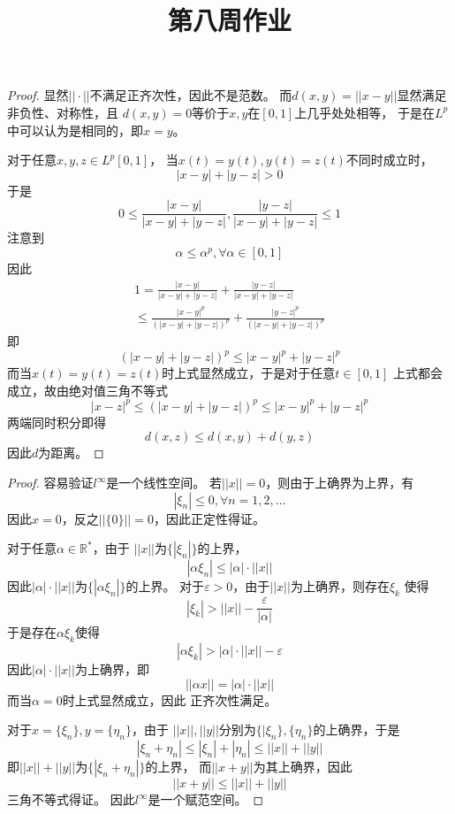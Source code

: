 \documentclass[cn]{homework}
\title{第八周作业}
\begin{document}
    \maketitle

    \problem

    \problem
    \begin{proof}
        显然$||\cdot||$不满足正齐次性，因此不是范数。
        而$d(x,y)=||x-y||$显然满足非负性、对称性，且
        $d(x,y)=0$等价于$x,y$在$[0,1]$上几乎处处相等，
        于是在$L^p$中可以认为是相同的，即$x=y$。

        对于任意$x,y,z\in L^p[0,1]$，
        当$x(t)=y(t),y(t)=z(t)$不同时成立时，
        \[|x-y|+|y-z|>0\]
        于是
        \[0\leq\frac{|x-y|}{|x-y|+|y-z|},\frac{|y-z|}{|x-y|+|y-z|}\leq 1\]
        注意到
        \[\alpha\leq\alpha^p,\forall\alpha\in[0,1]\]
        因此
        \begin{multline*}
            1=
            \frac{|x-y|}{|x-y|+|y-z|}+\frac{|y-z|}{|x-y|+|y-z|}\\
            \leq
            \frac{|x-y|^p}{(|x-y|+|y-z|)^p}+\frac{|y-z|^p}{(|x-y|+|y-z|)^p}
        \end{multline*}
        即
        \[(|x-y|+|y-z|)^p\leq |x-y|^p+|y-z|^p\]
        而当$x(t)=y(t)=z(t)$时上式显然成立，于是对于任意$t\in[0,1]$
        上式都会成立，故由绝对值三角不等式
        \[|x-z|^p\leq(|x-y|+|y-z|)^p\leq|x-y|^p+|y-z|^p\]
        两端同时积分即得
        \[d(x,z)\leq d(x,y)+d(y,z)\]
        因此$d$为距离。
    \end{proof}

    \problem
    \begin{proof}
        容易验证$l^\infty$是一个线性空间。
        若$||x||=0$，则由于上确界为上界，有
        \[|\xi_n|\leq 0,\forall n=1,2,\ldots\]
        因此$x=0$，反之$||\{0\}||=0$，因此正定性得证。

        对于任意$\alpha\in\mathbb R^*$，由于
        $||x||$为$\{|\xi_n|\}$的上界，
        \[|\alpha\xi_n|\leq|\alpha|\cdot||x||\]
        因此$|\alpha|\cdot||x||$为$\{|\alpha\xi_n|\}$的上界。
        对于$\varepsilon>0$，由于$||x||$为上确界，则存在$\xi_k$
        使得
        \[|\xi_k|>||x||-\frac\varepsilon{|\alpha|}\]
        于是存在$\alpha\xi_k$使得
        \[|\alpha\xi_k|>|\alpha|\cdot||x||-\varepsilon\]
        因此$|\alpha|\cdot||x||$为上确界，即
        \[||\alpha x||=|\alpha|\cdot||x||\]
        而当$\alpha=0$时上式显然成立，因此
        正齐次性满足。
        
        对于$x=\{\xi_n\},y=\{\eta_n\}$，由于
        $||x||,||y||$分别为$\{|\xi_n\},\{\eta_n\}$的上确界，于是
        \[|\xi_n+\eta_n|\leq|\xi_n|+|\eta_n|\leq||x||+||y||\]
        即$||x||+||y||$为$\{|\xi_n+\eta_n|\}$的上界，
        而$||x+y||$为其上确界，因此
        \[||x+y||\leq||x||+||y||\]
        三角不等式得证。
        因此$l^\infty$是一个赋范空间。
    \end{proof}
\end{document}
